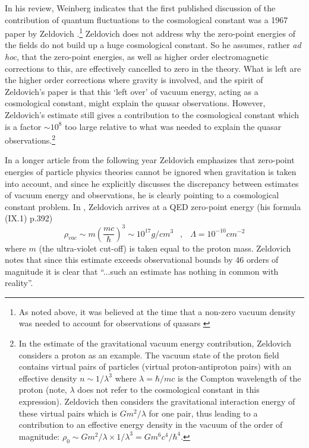 \documentclass[12pt]{article}
\newcommand{\beq}{\begin{equation}}
\newcommand{\eeq}{\end{equation}}
\begin{document}
In his review, Weinberg indicates that the first published discussion
of the contribution of quantum fluctuations to the cosmological
constant was a 1967 paper by Zeldovich
\cite{zeldovich67}.\footnote{As noted above, it was believed at the
time that a non-zero vacuum density was needed to account for
observations of quasars \cite{petrosian74}} Zeldovich does not
address why the zero-point energies of the fields do not build up a
huge cosmological constant.  So he assumes, rather {\em ad hoc}, that
the zero-point energies, as well as higher order electromagnetic
corrections to this, are effectively cancelled to zero in the
theory. What is left are the higher order corrections
where gravity is involved, and the spirit of Zeldovich's paper is
that this `left over' of vacuum energy, acting as a cosmological
constant, might explain the quasar observations. However, Zeldovich's
estimate still gives a contribution to the cosmological constant which
is a factor $\sim 10^8$ too large relative to what was needed to
explain the quasar observations.\footnote{In the estimate of the
gravitational vacuum energy contribution, Zeldovich considers a
proton as an example. The vacuum state of the proton field contains virtual
pairs of particles (virtual proton-antiproton pairs) with an effective
density $ n \sim 1 / \lambda^3 $ where $\lambda =
\hbar/ m c$ is the Compton wavelength of the proton (note, $\lambda$
does not refer to the cosmological constant in this expression). 
Zeldovich then considers the gravitational
interaction energy of these virtual pairs which is $G m^2 /
\lambda$ for one pair, thus leading to a contribution to an
effective energy density in the vacuum of the order of magnitude: $
\rho_0 \sim G m^2/\lambda \times 1/\lambda^3 = G m^6 c^4 / \hbar^4 $.}

In a longer article \cite{zeldovich68} from the following year
Zeldovich emphasizes that zero-point energies of particle
physics theories cannot be ignored when gravitation is taken into
account, and since he explicitly discusses the discrepancy
between estimates of vacuum energy and observations, he is
clearly pointing to a cosmological constant problem. In
\cite{zeldovich68}, Zeldovich arrives at a QED zero-point energy
(his formula (IX.1) p.392) 
\beq 
\rho_{vac} \sim m \left (\frac{mc}{\hbar} \right ) ^3 \sim 10^{17} g/cm^3
\:\;\; , \:\;\; \Lambda = 10^{-10} cm^{-2}
\eeq
where $m$ (the ultra-violet cut-off) is taken equal to the proton
mass. Zeldovich notes that since this estimate exceeds
observational bounds by 46 orders of magnitude it is clear that
``...such an estimate has nothing in common with reality''. 
\end{document}
